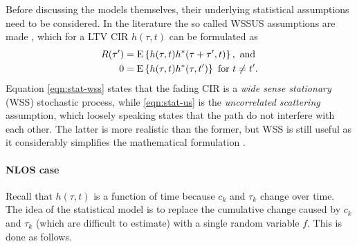 Before discussing the models themselves, their underlying statistical assumptions need to be considered. In the literature the so called WSSUS assumptions are made \cite{Messier, Gallager}, which for a LTV CIR \(h(\tau, t)\) can be formulated as
\begin{subequations}
	\begin{align}
		R(\tau') &= \operatorname{E} \left\{h(\tau, t) h^*(\tau + \tau', t)\right\}, \text{ and } \label{eqn:stat-wss} \\
		0 &= \operatorname{E} \left\{h(\tau, t) h^*(\tau, t')\right\} \text { for } t \neq t'. \label{eqn:stat-us}
	\end{align}
\end{subequations}
Equation \eqref{eqn:stat-wss} states that the fading CIR is a \emph{wide sense stationary} (WSS) stochastic process, while \eqref{eqn:stat-us} is the \emph{uncorrelated scattering} assumption, which loosely speaking states that the path do not interfere with each other. The latter is more realistic than the former, but WSS is still useful as it considerably simplifies the mathematical formulation \cite{Messier}.

\paragraph{NLOS case}

Recall that \(h(\tau, t)\) is a function of time because \(c_k\) and \(\tau_k\) change over time. The idea of the statistical model is to replace the cumulative change caused by \(c_k\) and \(\tau_k\) (which are difficult to estimate) with a single random variable \(f\). This is done as follows.

